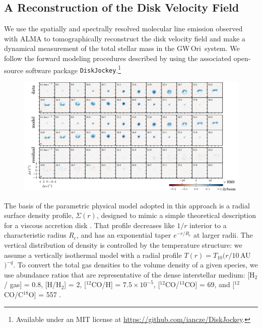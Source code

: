 \documentclass[twocolumn]{aastex61}
\newcommand{\obj}{GW\,Ori}
\begin{document}
\subsection{A Reconstruction of the Disk Velocity Field \label{sec:disk}}

We use the spatially and spectrally resolved molecular line emission observed with ALMA to tomographically reconstruct the disk velocity field and make a dynamical measurement of the total stellar mass in the \obj\ system. We follow the forward modeling procedures described by \citet{czekala15a,czekala16} using the associated open-source software package {\tt DiskJockey}.\footnote{Available under an MIT license at \url{https://github.com/iancze/DiskJockey}.}

\begin{figure}[ht!]
\begin{center}
  \includegraphics{chmaps_13CO.pdf}
  \end{center}
\end{figure}

The basis of the parametric physical model adopted in this approach is a radial surface density profile, $\Sigma(r)$, designed to mimic a simple theoretical description for a viscous accretion disk \citep{lyndenbell74,hartmann98}.  That profile decreases like $1/r$ interior to a characteristic radius $R_c$, and has an exponential taper $e^{-r/R_c}$ at larger radii.  The vertical distribution of density is controlled by the temperature structure: we assume a vertically isothermal model with a radial profile $T(r) = T_{10} (r/10$\,AU$)^{-q}$. To convert the total gas densities to the volume density of a given species, we use abundance ratios that are representative of the dense interstellar medium: [H$_2$/ gas] = 0.8, [H/H$_2$] = 2, [$^{12}$CO/H] = $7.5 \times 10^{-5}$, [$^{12}$CO/$^{13}$CO] = 69, and [$^{12}$CO/C$^{18}$O] = 557 \citep[e.g.,][]{henkel94,prantzos96}.
\end{document}
